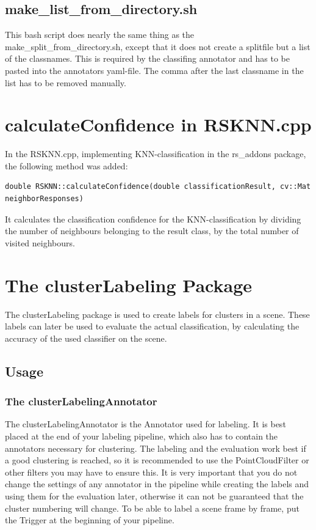 \documentclass[main.tex]{subfiles}
\begin{document}
\subsection{make\_list\_from\_directory.sh}
This bash script does nearly the same thing as the make\_split\_from\_directory.sh, except that it does not create a splitfile but a list of the classnames. This is required by the classifing annotator and has to be pasted into the annotators yaml-file. The comma after the last classname in the list has to be removed manually.

\section{calculateConfidence in RSKNN.cpp}
In the RSKNN.cpp, implementing KNN-classification in the rs\_addons package, the following method was added:

\begin{lstlisting}
double RSKNN::calculateConfidence(double classificationResult, cv::Mat neighborResponses)
\end{lstlisting}

It calculates the classification confidence for the KNN-classification by dividing the number of neighbours belonging to the result class, by the total number of visited neighbours. 

\section{The clusterLabeling Package}
The clusterLabeling package is used to create labels for clusters in a scene. These labels can later be used to evaluate the actual classification, by calculating the accuracy of the used classifier on the scene.

\subsection{Usage}

\subsubsection{The clusterLabelingAnnotator}
The clusterLabelingAnnotator is the Annotator used for labeling. It is best placed at the end of your labeling pipeline, which also has to contain the annotators necessary for clustering. The labeling and the evaluation work best if a good clustering is reached, so it is recommended to use the PointCloudFilter or other filters you may have to ensure this. It is very important that you do not change the settings of any annotator in the pipeline while creating the labels and using them for the evaluation later, otherwise it can not be guaranteed that the cluster numbering will change. To be able to label a scene frame by frame, put the Trigger at the beginning of your pipeline.\\
\end{document}
